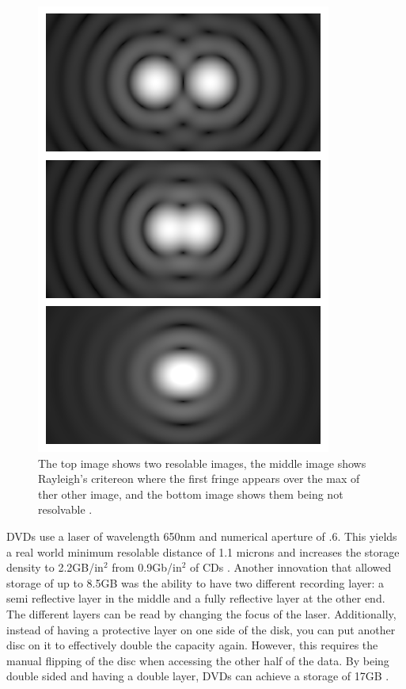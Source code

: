 \documentclass[ notitlepage, numerical, 11pt]{revtex4-1} %
\begin{document}
\begin{figure}[H]
\centerline{\includegraphics[scale=.45]{criterion.png}}
\caption{The top image shows two resolable images, the middle image shows Rayleigh's critereon where the first fringe appears over the max of ther other image, and the bottom image shows them being not resolvable \cite{rayleigh}.}
\label{criterion}
\end{figure} 


DVDs use a laser of wavelength 650nm and numerical aperture of .6. This yields a real world minimum resolable distance of 1.1 microns and increases the storage density to 2.2GB/in$^2$ from 0.9Gb/in$^2$ of CDs \cite{memory}. Another innovation that allowed storage of up to 8.5GB was the ability to have two different recording layer: a semi reflective layer in the middle and a fully reflective layer at the other end. The different layers can be read by changing the focus of the laser. Additionally, instead of having a protective layer on one side of the disk, you can put another disc on it to effectively double the capacity again. However, this requires the manual flipping of the disc when accessing the other half of the data. By being double sided and having a double layer, DVDs can achieve a storage of 17GB \cite{memory}.
\end{document}
